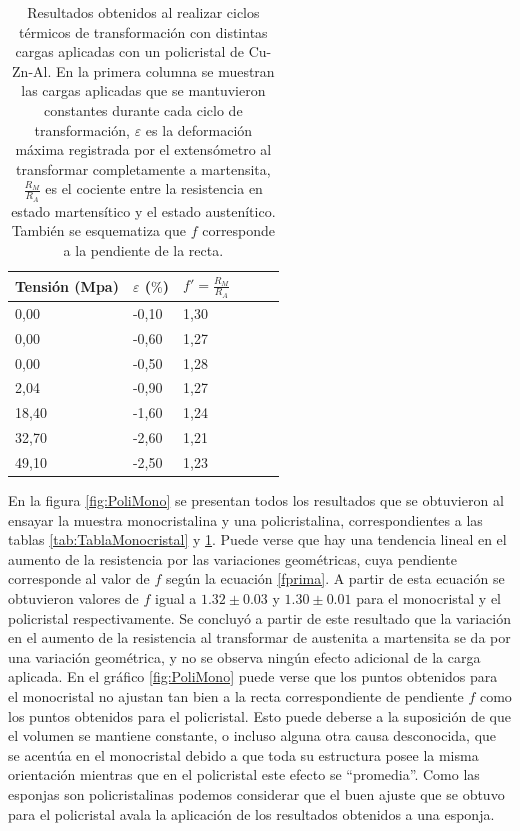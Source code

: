 \documentclass[a4paper,12pt,fleqn,twoside,openany]{book}
\begin{document}
\begin{table} 
\begin{center} 
\begin{tabular}{@{}llllll@{}} \toprule
Tensión (Mpa) & $\varepsilon$ ($\%$) &  $f'=\frac{R_M}{R_A}$\\ \midrule
 0,00        &  -0,10   & 1,30\\
 0,00       &  -0,60   & 1,27 \\
 0,00      &  -0,50   & 1,28 \\
 2,04      &  -0,90  & 1,27\\
 18,40    &  -1,60  & 1,24 \\
32,70      &  -2,60 & 1,21\\
 49,10     &  -2,50  & 1,23   \\
 \bottomrule
\end{tabular}
\caption{Resultados obtenidos al realizar ciclos térmicos de transformación con distintas cargas aplicadas con un policristal de Cu-Zn-Al. En la primera columna se muestran las cargas aplicadas que se mantuvieron constantes durante cada ciclo de transformación, $\varepsilon$ es la deformación máxima registrada por el extensómetro al transformar completamente a martensita, $\frac{R_M}{R_A}$ es el cociente entre la resistencia en estado martensítico y el estado austenítico. También se esquematiza que $f$ corresponde a la pendiente de la recta.}
\label{tab:TablaPolicristal}
\end{center}
\end{table}

En la figura \ref{fig:PoliMono} se presentan todos los resultados que se obtuvieron al ensayar la muestra monocristalina y una policristalina, correspondientes a las tablas \ref{tab:TablaMonocristal} y \ref{tab:TablaPolicristal}. Puede verse que hay una tendencia lineal en el aumento de la resistencia por las variaciones geométricas, cuya pendiente corresponde al valor de $f$ según la ecuación \ref{fprima}. A partir de esta ecuación se obtuvieron valores de $f$ igual a $1.32\pm0.03$ y $1.30 \pm 0.01$ para el monocristal y el policristal respectivamente.  Se concluyó a partir de este resultado que la variación en el aumento de la resistencia al transformar de austenita a martensita se da por una variación geométrica, y no se observa ningún efecto adicional de la carga aplicada.
En el gráfico \ref{fig:PoliMono} puede verse que los puntos obtenidos para el monocristal no ajustan tan bien a la recta correspondiente de pendiente $f$ como los puntos obtenidos para el policristal. Esto puede deberse a la suposición de que el volumen se mantiene constante, o incluso alguna otra causa desconocida, que se acentúa en el monocristal debido a que toda su estructura posee la misma orientación mientras que en el policristal este efecto se ``promedia''. Como las esponjas son policristalinas podemos considerar que el buen ajuste que se obtuvo para el policristal avala la aplicación de los resultados obtenidos a una esponja.
\end{document}
